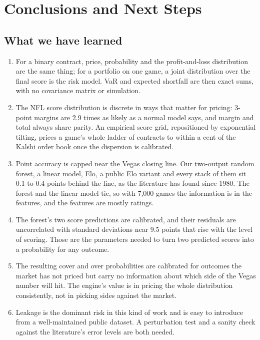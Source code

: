 \section{Conclusions and Next Steps}

\subsection{What we have learned}
\begin{enumerate}[nosep]
\item For a binary contract, price, probability and the profit-and-loss distribution are the same thing; for a portfolio on one game, a joint distribution over the final score is the risk model. VaR and expected shortfall are then exact sums, with no covariance matrix or simulation.
\item The NFL score distribution is discrete in ways that matter for pricing: 3-point margins are 2.9 times as likely as a normal model says, and margin and total always share parity. An empirical score grid, repositioned by exponential tilting, prices a game's whole ladder of contracts to within a cent of the Kalshi order book once the dispersion is calibrated.
\item Point accuracy is capped near the Vegas closing line. Our two-output random forest, a linear model, Elo, a public Elo variant and every stack of them sit 0.1 to 0.4 points behind the line, as the literature has found since 1980. The forest and the linear model tie, so with 7,000 games the information is in the features, and the features are mostly ratings.
\item The forest's two score predictions are calibrated, and their residuals are uncorrelated with standard deviations near 9.5 points that rise with the level of scoring. Those are the parameters needed to turn two predicted scores into a probability for any outcome.
\item The resulting cover and over probabilities are calibrated for outcomes the market has not priced but carry no information about which side of the Vegas number will hit. The engine's value is in pricing the whole distribution consistently, not in picking sides against the market.
\item Leakage is the dominant risk in this kind of work and is easy to introduce from a well-maintained public dataset. A perturbation test and a sanity check against the literature's error levels are both needed.
\end{enumerate}

